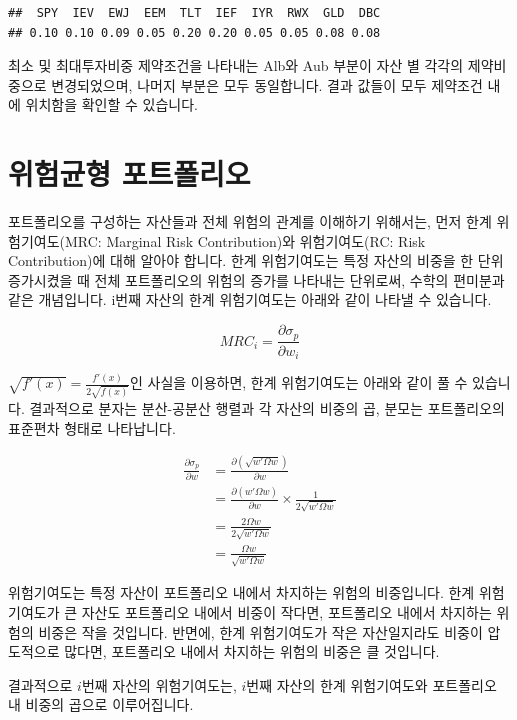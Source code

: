 \documentclass[12pt,]{book}
\begin{document}
\begin{verbatim}
##  SPY  IEV  EWJ  EEM  TLT  IEF  IYR  RWX  GLD  DBC 
## 0.10 0.10 0.09 0.05 0.20 0.20 0.05 0.05 0.08 0.08
\end{verbatim}

최소 및 최대투자비중 제약조건을 나타내는 Alb와 Aub 부분이 자산 별 각각의 제약비중으로 변경되었으며, 나머지 부분은 모두 동일합니다. 결과 값들이 모두 제약조건 내에 위치함을 확인할 수 있습니다.

\hypertarget{section-76}{%
\section{위험균형 포트폴리오}\label{section-76}}

포트폴리오를 구성하는 자산들과 전체 위험의 관계를 이해하기 위해서는, 먼저 한계 위험기여도(MRC: Marginal Risk Contribution)와 위험기여도(RC: Risk Contribution)에 대해 알아야 합니다. 한계 위험기여도는 특정 자산의 비중을 한 단위 증가시켰을 때 전체 포트폴리오의 위험의 증가를 나타내는 단위로써, 수학의 편미분과 같은 개념입니다. i번째 자산의 한계 위험기여도는 아래와 같이 나타낼 수 있습니다.

\[MRC_i = \frac{\partial\sigma_p}{\partial w_i} \]

\(\sqrt {f'(x)} = \frac{f'(x)}{2\sqrt{f(x)}}\)인 사실을 이용하면, 한계 위험기여도는 아래와 같이 풀 수 있습니다. 결과적으로 분자는 분산-공분산 행렬과 각 자산의 비중의 곱, 분모는 포트폴리오의 표준편차 형태로 나타납니다.

\begin{equation*} 
\begin{split}
\frac{\partial\sigma_p}{\partial w} & = \frac{\partial(\sqrt{w'\Omega w})}{\partial w} \\
& =\frac{\partial(w'\Omega w)}{\partial w} \times \frac{1}{2\sqrt{w'\Omega w}} \\
& =\frac{2\Omega w}{2\sqrt{w'\Omega w}} \\
& =\frac{\Omega w}{\sqrt{w'\Omega w}}
\end{split}
\end{equation*}

위험기여도는 특정 자산이 포트폴리오 내에서 차지하는 위험의 비중입니다. 한계 위험기여도가 큰 자산도 포트폴리오 내에서 비중이 작다면, 포트폴리오 내에서 차지하는 위험의 비중은 작을 것입니다. 반면에, 한계 위험기여도가 작은 자산일지라도 비중이 압도적으로 많다면, 포트폴리오 내에서 차지하는 위험의 비중은 클 것입니다.

결과적으로 \(i\)번째 자산의 위험기여도는, \(i\)번째 자산의 한계 위험기여도와 포트폴리오 내 비중의 곱으로 이루어집니다.
\end{document}
